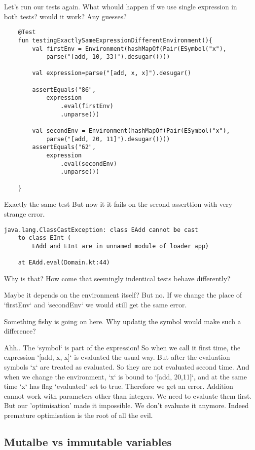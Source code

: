 \documentclass[11pt]{article}
\begin{document}
Let's run our tests again.
What whould happen if we use single expression in both tests?
would it work? Any guesses?
\begin{verbatim}
    @Test
    fun testingExactlySameExpressionDifferentEnvironment(){
        val firstEnv = Environment(hashMapOf(Pair(ESymbol("x"),
            parse("[add, 10, 33]").desugar())))

        val expression=parse("[add, x, x]").desugar()

        assertEquals("86",
            expression
                .eval(firstEnv)
                .unparse())

        val secondEnv = Environment(hashMapOf(Pair(ESymbol("x"),
            parse("[add, 20, 11]").desugar())))
        assertEquals("62",
            expression
                .eval(secondEnv)
                .unparse())

    }
\end{verbatim}

Exactly the same test
But now it it fails on the second asserttion with very strange error.

\begin{verbatim}
java.lang.ClassCastException: class EAdd cannot be cast
    to class EInt (
        EAdd and EInt are in unnamed module of loader app)

	at EAdd.eval(Domain.kt:44)
\end{verbatim}

Why is that? How come that seemingly indentical tests behave differently?

Maybe it depends on the environment itself? But no.
If we change the place of `firstEnv` and `secondEnv` we would still get the same error.

Something fishy is going on here. Why updatig the symbol would make such a difference?

Ahh.. The `symbol` is part of the expression!
So when we call it first time, the expression `[add, x, x]` is evaluated the usual way.
But after the evaluation symbols `x` are treated as evaluated.
So they are not evaluated second time.
And when we change the environment, `x` is bound to `[add, 20,11]`, and at the same time `x` has flag `evaluated` set to true.
Therefore we get an error.
Addition cannot work with parameters other than integers. We need to evaluate them first. But our 'optimisation' made it impossible. We don't evaluate it anymore.
Indeed premature optimisation is the root of all the evil.


\subsection{Mutalbe vs immutable variables}
\label{sec:orge8405fa}
\end{document}

